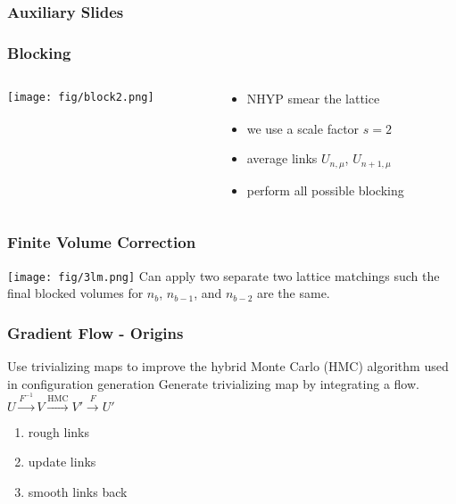 
\begin{frame}
  \addtocounter{framenumber}{-1}
  \frametitle{Auxiliary Slides}
\end{frame}

\begin{frame}
  \addtocounter{framenumber}{-1}
  \frametitle{Blocking}
  \begin{columns}[T]
    \begin{column}{.5\textwidth}
      \begin{block}{}
        \texttt{[image: fig/block2.png]}
      \end{block}
    \end{column}
    \begin{column}{.5\textwidth}
      \begin{block}{}
        \begin{itemize}
          \item NHYP smear the lattice
          \item we use a scale factor $s=2$
          \item average links $U_{n,\mu}$, $U_{n+1,\mu}$
          \item perform all possible blocking
        \end{itemize}
      \end{block}
    \end{column}
  \end{columns}
\end{frame}

\begin{frame}
  \addtocounter{framenumber}{-1}
  \frametitle{Finite Volume Correction}
  \centering
  \texttt{[image: fig/3lm.png]}
  \vspace{12pt}
  Can apply two separate two lattice matchings such the final blocked volumes for $n_b$, $n_{b-1}$, and $n_{b-2}$ are the same.
\end{frame}

\begin{frame}
  \frametitle{Gradient Flow - Origins}
  Use trivializing maps to improve the hybrid Monte Carlo (HMC) algorithm used in configuration generation\newline
  \vspace{12pt}
  Generate trivializing map by integrating a flow.
  \newline
  $U \xrightarrow{F^{-1}} V \xrightarrow{\text{HMC}} V' \xrightarrow{F} U'$
  \newline
  \begin{enumerate}
    \item rough links
    \item update links
    \item smooth links back
  \end{enumerate}
\end{frame}

